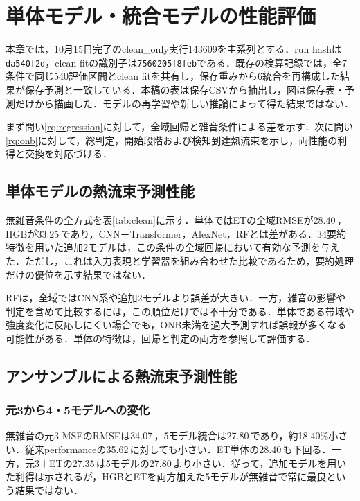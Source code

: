 \chapter{単体モデル・統合モデルの性能評価}\label{ch:results}
本章では，10月15日完了のclean\_only実行143609を主系列とする\cite{localMainRun}．run hashは\texttt{da540f2d}，clean fitの識別子は\texttt{7560205f8feb}である．既存の検算記録では，全7条件で同じ540評価区間とclean fitを共有し，保存重みから6統合を再構成した結果が保存予測と一致している．本稿の表は保存CSVから抽出し，図は保存表・予測だけから描画した．モデルの再学習や新しい推論によって得た結果ではない．

まず問い\ref{rq:regression}に対して，全域回帰と雑音条件による差を示す．次に問い\ref{rq:onb}に対して，総判定，開始段階および検知到達熱流束を示し，両性能の利得と交換を対応づける．

\section{単体モデルの熱流束予測性能}
無雑音条件の全方式を表\ref{tab:clean}に示す．単体ではETの全域RMSEが28.40\,\kw{}，HGBが33.25\,\kw{}であり，CNN＋Transformer，AlexNet，RFとは差がある．34要約特徴を用いた追加2モデルは，この条件の全域回帰において有効な予測を与えた．ただし，これは入力表現と学習器を組み合わせた比較であるため，要約処理だけの優位を示す結果ではない．

\begin{table}[htbp]
\centering\small
\caption{無雑音における単体・統合の性能．RMSEの単位は\kw{}．近傍は30区間．}
\label{tab:clean}

\end{table}

RFは，全域ではCNN系や追加2モデルより誤差が大きい．一方，雑音の影響や判定を含めて比較するには，この順位だけでは不十分である．単体である帯域や強度変化に反応しにくい場合でも，ONB未満を過大予測すれば誤報が多くなる可能性がある．単体の特徴は，回帰と判定の両方を参照して評価する．

\section{アンサンブルによる熱流束予測性能}
\subsection{元3から4・5モデルへの変化}
無雑音の元3 MSEのRMSEは34.07\,\kw{}，5モデル統合は27.80\,\kw{}であり，約18.40\%小さい．従来performanceの35.62\,\kw{}に対しても小さい．ET単体の28.40\,\kw{}も下回る．一方，元3＋ETの27.35\,\kw{}は5モデルの27.80\,\kw{}より小さい．従って，追加モデルを用いた利得は示されるが，HGBとETを両方加えた5モデルが無雑音で常に最良という結果ではない．

